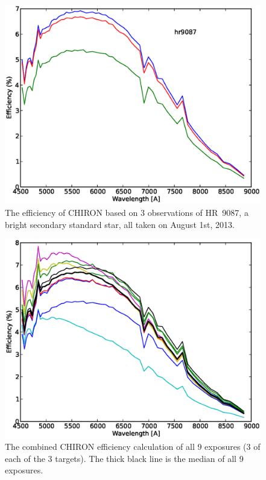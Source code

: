 \documentclass[iop]{emulateapj}
\begin{document}
\begin{figure}[ht]
\includegraphics[scale=0.4,angle=0]{fig_eff_hr9087_all.eps}
\caption{\label{fig:hr9087} The efficiency of CHIRON based on 3 observations of HR~9087, a bright secondary standard star, all taken on August 1st, 2013.}
\end{figure}

\begin{figure}[ht]
\includegraphics[scale=0.4,angle=0]{fig_medeff_all.eps}
\caption{\label{fig:effall} The combined CHIRON efficiency calculation of all 9 exposures (3 of each of the 3 targets). The thick black line is the median of all 9 exposures.}
\end{figure}
\end{document}
